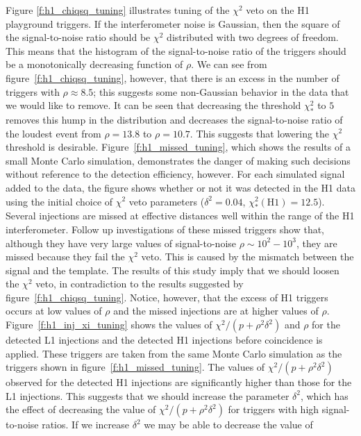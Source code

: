 Figure \ref{f:h1_chiqsq_tuning} illustrates tuning of the $\chi^2$ veto on the
H1 playground triggers. If the interferometer noise is Gaussian, then the
square of the signal-to-noise ratio should be $\chi^2$ distributed with two
degrees of freedom. This means that the histogram of the signal-to-noise ratio
of the triggers should be a monotonically decreasing function of $\rho$. We
can see from figure~\ref{f:h1_chiqsq_tuning}, however, that there is an excess
in the number of triggers with $\rho \approx 8.5$; this suggests some
non-Gaussian behavior in the data that we would like to remove. It can be seen
that decreasing the threshold $\chi^2_\ast$ to $5$ removes this hump in the
distribution and decreases the signal-to-noise ratio of the loudest event from
$\rho = 13.8$ to $\rho = 10.7$. This suggests that lowering the $\chi^2$
threshold is desirable.  Figure~\ref{f:h1_missed_tuning}, which shows the
results of a small Monte Carlo simulation, demonstrates the danger of making
such decisions without reference to the detection efficiency, however. For
each simulated signal added to the data, the figure shows whether or not it was
detected in the H1 data using the initial choice of $\chi^2$ veto parameters
($\delta^2 = 0.04$, $\chi^2_\ast(\mathrm{H1}) = 12.5$). Several injections are
missed at effective distances well within the range of the H1 interferometer.
Follow up investigations of these missed triggers show that, although they
have very large values of signal-to-noise $\rho \sim 10^2 - 10^3$, they are
missed because they fail the $\chi^2$ veto. This is caused by the mismatch
between the signal and the template.  The results of this study imply that we
should loosen the $\chi^2$ veto, in contradiction to the results suggested by
figure~\ref{f:h1_chiqsq_tuning}.  Notice, however, that the excess of H1
triggers occurs at low values of $\rho$ and the missed injections are at
higher values of $\rho$. Figure~\ref{f:h1_inj_xi_tuning} shows the values of
$\chi^2/(p+\rho^2\delta^2)$ and $\rho$ for the detected L1 injections and the
detected H1 injections before coincidence is applied. These triggers are taken
from the same Monte Carlo simulation as the triggers shown in
figure~\ref{f:h1_missed_tuning}. The values of $\chi^2/(p+\rho^2\delta^2)$
observed for the detected H1 injections are significantly higher than those
for the L1 injections. This suggests that we should increase the parameter
$\delta^2$, which has the effect of decreasing the value of
$\chi^2/(p+\rho^2\delta^2)$ for triggers with high signal-to-noise ratios. If
we increase $\delta^2$ we may be able to decrease the value of
